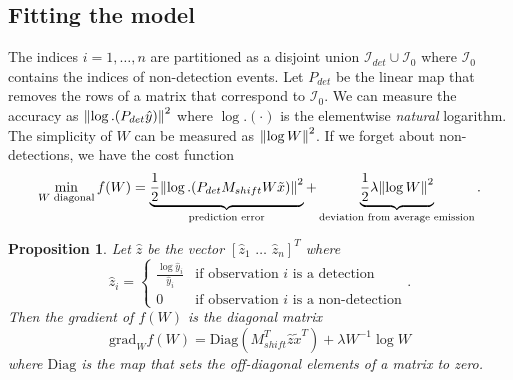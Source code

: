 \documentclass{article}
\newtheorem{proposition}{Proposition}
\begin{document}
\subsection{Fitting the model}
The indices $i = 1,\dots,n$ are partitioned as a disjoint union $\mathcal{I}_{det} \cup \mathcal{I}_{0}$ where $\mathcal{I}_0$ contains the indices of non-detection events. Let $P_{det}$ be the linear map that removes the rows of a matrix that correspond to $\mathcal{I}_0$. We can measure the accuracy as $\norm{\log.(P_{det} \hat{y})}^2$ where $\log.(\cdot)$ is the elementwise \emph{natural} logarithm. The simplicity of $W$ can be measured as $\norm{\log W}^2$. If we forget about non-detections, we have the cost function 
$$
\min_{W \text{ diagonal}} f(W) =
\underbrace{\frac{1}{2}\norm{\log.(P_{det} M_{shift} W \tilde{x})}^2}_{\text{prediction error}} + \underbrace{\frac{1}{2}\lambda \norm{\log W}^2}_{\text{deviation from average emission}}
.$$
\begin{proposition}
    Let $\hat{z}$ be the vector $[\hat{z}_1\,\,\dots\,\,\hat{z}_n]^T$ where 
    $$
    \hat{z}_i = \begin{cases}
        \frac{\log \hat{y}_i}{\hat{y}_i} & \text{if observation $i$ is a detection} \\
        0 & \text{if observation $i$ is a non-detection} 
    \end{cases}
    .$$
    Then the gradient of $f(W)$ is the diagonal matrix
    $$
    \mathrm{grad}_{W} f(W) = \mathrm{Diag}\left(M_{shift}^T \hat{z} \tilde{x}^T\right) + \lambda W^{-1} \log W
    $$
    where $\mathrm{Diag}$ is the map that sets the off-diagonal elements of a matrix to zero.
\end{proposition}
\end{document}

